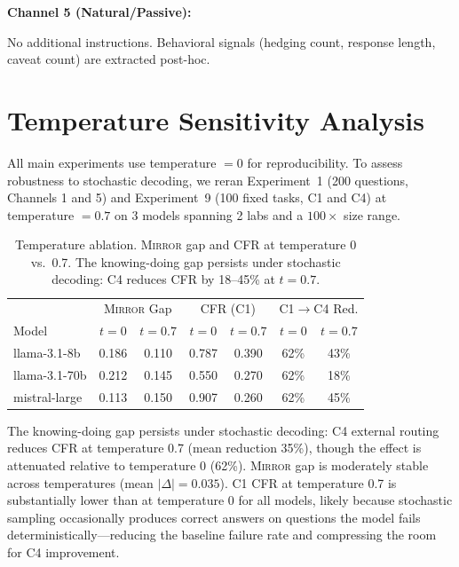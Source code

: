 \documentclass[10pt]{article}
\newcommand{\mirror}{\textsc{Mirror}}
\begin{document}
\textbf{Channel 5 (Natural/Passive):}
\begin{quote}\small{}
\end{quote}
No additional instructions. Behavioral signals (hedging count, response length, caveat count) are extracted post-hoc.

\section{Temperature Sensitivity Analysis}
\label{app:temp}

All main experiments use temperature $= 0$ for reproducibility. To assess robustness to stochastic decoding, we reran Experiment~1 (200 questions, Channels 1 and 5) and Experiment~9 (100 fixed tasks, C1 and C4) at temperature $= 0.7$ on 3 models spanning 2 labs and a $100\times$ size range.

\begin{table}[h]
\centering
\caption{Temperature ablation. \mirror{} gap and CFR at temperature 0 vs.\ 0.7. The knowing-doing gap persists under stochastic decoding: C4 reduces CFR by 18--45\% at $t=0.7$.}
\label{tab:temp-ablation}
\small
\begin{tabular}{lcccccc}
\toprule
& \multicolumn{2}{c}{\mirror{} Gap} & \multicolumn{2}{c}{CFR (C1)} & \multicolumn{2}{c}{C1$\to$C4 Red.} \\
Model & $t{=}0$ & $t{=}0.7$ & $t{=}0$ & $t{=}0.7$ & $t{=}0$ & $t{=}0.7$ \\
\midrule
llama-3.1-8b & 0.186 & 0.110 & 0.787 & 0.390 & 62\% & 43\% \\
llama-3.1-70b & 0.212 & 0.145 & 0.550 & 0.270 & 62\% & 18\% \\
mistral-large & 0.113 & 0.150 & 0.907 & 0.260 & 62\% & 45\% \\
\bottomrule
\end{tabular}
\end{table}

The knowing-doing gap persists under stochastic decoding: C4 external routing reduces CFR at temperature 0.7 (mean reduction 35\%), though the effect is attenuated relative to temperature 0 (62\%). \mirror{} gap is moderately stable across temperatures (mean $|\Delta| = 0.035$). C1 CFR at temperature 0.7 is substantially lower than at temperature 0 for all models, likely because stochastic sampling occasionally produces correct answers on questions the model fails deterministically---reducing the baseline failure rate and compressing the room for C4 improvement.
\end{document}
